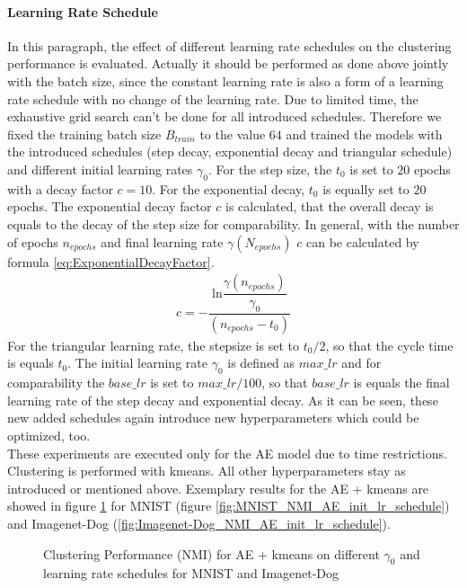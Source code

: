 \documentclass[12pt,DIV14,BCOR12mm,a4paper,footexclude,headinclude,halfparskip-,twoside,openright,cleardoubleempty,idxtotoc,bibtotoc,listtotoc]{scrreprt} %
\numberwithin{equation}{chapter}
\begin{document}
\paragraph{Learning Rate Schedule}
In this paragraph, the effect of different learning rate schedules on the clustering performance is evaluated. Actually it should be performed as done above jointly with the batch size, since the constant learning rate is also a form of a learning rate schedule with no change of the learning rate. Due to limited time, the exhaustive grid search can't be done for all introduced schedules. Therefore we fixed the training batch size $B_{train}$ to the value $64$ and trained the models with the introduced schedules (step decay, exponential decay and triangular schedule) and different initial learning rates $\gamma_0$. For the step size, the $t_0$ is set to $20$ epochs with a decay factor $c=10$. For the exponential decay, $t_0$ is equally set to $20$ epochs. The exponential decay factor $c$ is calculated, that the overall decay is equals to the decay of the step size for comparability. In general, with the number of epochs $n_{epochs}$ and final learning rate $\gamma(N_{epochs})$ $c$ can be calculated by formula \ref{eq:ExponentialDecayFactor}. 
\begin{align}
	c=-\dfrac{\textrm{ln}\dfrac{\gamma(n_{epochs})}{\gamma_0}}{(n_{epochs}-t_0)}\label{eq:ExponentialDecayFactor}
\end{align}
For the triangular learning rate, the stepsize is set to $t_0/2$, so that the cycle time is equals $t_0$. The initial learning rate $\gamma_0$ is defined as $max\_lr$ and for comparability the $base\_lr$ is set to $max\_lr/100$, so that $base\_lr$ is equals the final learning rate of the step decay and exponential decay. As it can be seen, these new added schedules again introduce new hyperparameters which could be optimized, too.\\
These experiments are executed only for the AE model due to time restrictions. Clustering is performed with kmeans. All other hyperparameters stay as introduced or mentioned above. Exemplary results for the AE + kmeans are showed in figure \ref{fig:ClusterPerformance_AE_init_lr_schedule} for MNIST (figure \ref{fig:MNIST_NMI_AE_init_lr_schedule}) and Imagenet-Dog (\ref{fig:Imagenet-Dog_NMI_AE_init_lr_schedule}).
	 \begin{figure}[htb!]
		\centering
		\qquad
		\caption{Clustering Performance (NMI) for AE + kmeans on different $\gamma_0$ and learning rate schedules for MNIST and Imagenet-Dog}
		\label{fig:ClusterPerformance_AE_init_lr_schedule}
	\end{figure}
\end{document}
